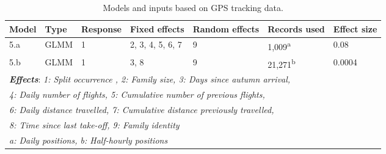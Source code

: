 \documentclass[10pt,twocolumn]{paper}
\begin{document}
\begin{table*} \centering
\begin{tabular}{l*6l}
\toprule
Model & Type & Response & Fixed effects & Random effects & Records used & Effect size\\
\midrule
5.a & GLMM & 1 & 2, 3, 4, 5, 6, 7 & 9 & 1,009\textsuperscript{a} & 0.08 \\

5.b & GLMM & 1 & 3, 8 & 9 & 21,271\textsuperscript{b} & 0.0004\\
\midrule
\multicolumn{6}{l}{\textbf{\emph{Effects}}: \emph{1: Split occurrence , 2: Family size, 3: Days since autumn arrival,}}\\
\multicolumn{6}{l}{\emph{4: Daily number of flights, 5: Cumulative number of previous flights,}}\\
\multicolumn{6}{l}{\emph{6: Daily distance travelled, 7: Cumulative distance previously travelled,}}\\
\multicolumn{6}{l}{\emph{8: Time since last take-off, 9: Family identity}}\\
\midrule
\multicolumn{6}{l}{\emph{a: Daily positions, b: Half-hourly positions}}\\
\bottomrule
\end{tabular}

\caption{Models and inputs based on GPS tracking data.}

\end{table*}
\end{document}

